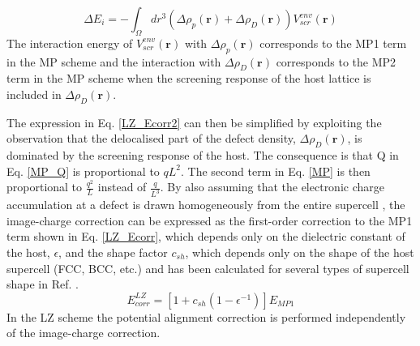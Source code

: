 \documentclass[11pt, twoside]{report}
\begin{document}
\begin{equation}\label{LZ_Ecorr2}
\Delta E_i = - \int_{\Omega} dr^3 ( \Delta \rho_p(\mathbf{r}) + \Delta \rho_D(\mathbf{r}) ) V_{scr}^{env}(\mathbf{r})
\end{equation}
The interaction energy of $ V_{scr}^{env}(\mathbf{r})$ with $\Delta \rho_p(\mathbf{r})$ corresponds to the MP1 term in the MP scheme and the interaction with $\Delta \rho_D(\mathbf{r}) $ corresponds to the MP2 term in the MP scheme when the screening response of the host lattice is included in $\Delta \rho_D(\mathbf{r})$.

The expression in Eq. \ref{LZ_Ecorr2} can then be simplified by exploiting the observation that the delocalised part of the defect density, $\Delta \rho_D(\mathbf{r})$, is dominated by the screening response of the host. The consequence is that Q in Eq. \ref{MP_Q} is proportional to $q L^2$. The second term in Eq. \ref{MP} is then proportional to $\frac{q^2}{L}$ instead of $\frac{q}{L^3}$. By also assuming that the electronic charge accumulation at a defect is drawn homogeneously from the entire supercell \cite{Lany_defects_2008}, the image-charge correction can be expressed as the first-order correction to the MP1 term shown in Eq. \ref{LZ_Ecorr}, which depends only on the dielectric constant of the host, $\epsilon$, and the shape factor $c_{sh}$, which depends only on the shape of the host supercell (FCC, BCC, etc.) and has been calculated for several types of supercell shape in Ref. .
\begin{equation}\label{LZ_Ecorr}
E_{corr}^{LZ} = [1 + c_{sh} (1 - \epsilon^{-1}) ] E_{MP1}
\end{equation}
In the LZ scheme the potential alignment correction is performed independently of the image-charge correction.
\end{document}
